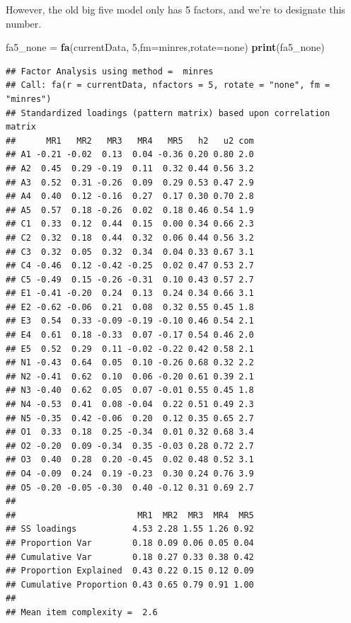 \documentclass[
]{ctexart}
\newenvironment{Shaded}{\begin{snugshade}}{\end{snugshade}}
\newcommand{\AttributeTok}[1]{\textcolor[rgb]{0.13,0.29,0.53}{#1}}
\newcommand{\DecValTok}[1]{\textcolor[rgb]{0.00,0.00,0.81}{#1}}
\newcommand{\FunctionTok}[1]{\textcolor[rgb]{0.13,0.29,0.53}{\textbf{#1}}}
\newcommand{\NormalTok}[1]{#1}
\newcommand{\OtherTok}[1]{\textcolor[rgb]{0.56,0.35,0.01}{#1}}
\newcommand{\StringTok}[1]{\textcolor[rgb]{0.31,0.60,0.02}{#1}}
\begin{document}
However, the old big five model only has 5 factors, and we're to
designate this number.

\begin{Shaded}
\begin{Highlighting}[]
\NormalTok{fa5\_none }\OtherTok{=} \FunctionTok{fa}\NormalTok{(currentData, }\DecValTok{5}\NormalTok{,}\AttributeTok{fm=}\StringTok{\textquotesingle{}minres\textquotesingle{}}\NormalTok{,}\AttributeTok{rotate=}\StringTok{\textquotesingle{}none\textquotesingle{}}\NormalTok{)  }
\FunctionTok{print}\NormalTok{(fa5\_none)}
\end{Highlighting}
\end{Shaded}

\begin{verbatim}
## Factor Analysis using method =  minres
## Call: fa(r = currentData, nfactors = 5, rotate = "none", fm = "minres")
## Standardized loadings (pattern matrix) based upon correlation matrix
##      MR1   MR2   MR3   MR4   MR5   h2   u2 com
## A1 -0.21 -0.02  0.13  0.04 -0.36 0.20 0.80 2.0
## A2  0.45  0.29 -0.19  0.11  0.32 0.44 0.56 3.2
## A3  0.52  0.31 -0.26  0.09  0.29 0.53 0.47 2.9
## A4  0.40  0.12 -0.16  0.27  0.17 0.30 0.70 2.8
## A5  0.57  0.18 -0.26  0.02  0.18 0.46 0.54 1.9
## C1  0.33  0.12  0.44  0.15  0.00 0.34 0.66 2.3
## C2  0.32  0.18  0.44  0.32  0.06 0.44 0.56 3.2
## C3  0.32  0.05  0.32  0.34  0.04 0.33 0.67 3.1
## C4 -0.46  0.12 -0.42 -0.25  0.02 0.47 0.53 2.7
## C5 -0.49  0.15 -0.26 -0.31  0.10 0.43 0.57 2.7
## E1 -0.41 -0.20  0.24  0.13  0.24 0.34 0.66 3.1
## E2 -0.62 -0.06  0.21  0.08  0.32 0.55 0.45 1.8
## E3  0.54  0.33 -0.09 -0.19 -0.10 0.46 0.54 2.1
## E4  0.61  0.18 -0.33  0.07 -0.17 0.54 0.46 2.0
## E5  0.52  0.29  0.11 -0.02 -0.22 0.42 0.58 2.1
## N1 -0.43  0.64  0.05  0.10 -0.26 0.68 0.32 2.2
## N2 -0.41  0.62  0.10  0.06 -0.20 0.61 0.39 2.1
## N3 -0.40  0.62  0.05  0.07 -0.01 0.55 0.45 1.8
## N4 -0.53  0.41  0.08 -0.04  0.22 0.51 0.49 2.3
## N5 -0.35  0.42 -0.06  0.20  0.12 0.35 0.65 2.7
## O1  0.33  0.18  0.25 -0.34  0.01 0.32 0.68 3.4
## O2 -0.20  0.09 -0.34  0.35 -0.03 0.28 0.72 2.7
## O3  0.40  0.28  0.20 -0.45  0.02 0.48 0.52 3.1
## O4 -0.09  0.24  0.19 -0.23  0.30 0.24 0.76 3.9
## O5 -0.20 -0.05 -0.30  0.40 -0.12 0.31 0.69 2.7
## 
##                        MR1  MR2  MR3  MR4  MR5
## SS loadings           4.53 2.28 1.55 1.26 0.92
## Proportion Var        0.18 0.09 0.06 0.05 0.04
## Cumulative Var        0.18 0.27 0.33 0.38 0.42
## Proportion Explained  0.43 0.22 0.15 0.12 0.09
## Cumulative Proportion 0.43 0.65 0.79 0.91 1.00
## 
## Mean item complexity =  2.6

\end{verbatim}
\end{document}
